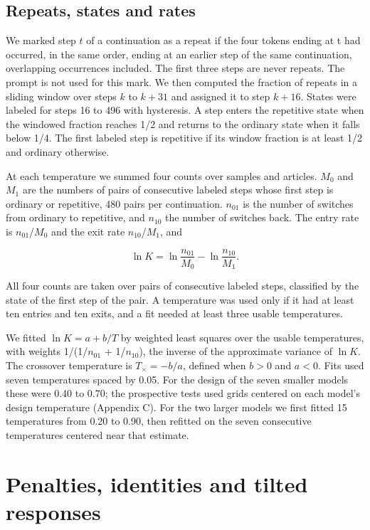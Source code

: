 \documentclass[aps,prx,onecolumn,superscriptaddress,longbibliography]{revtex4-2}
\begin{document}
\subsection{Repeats, states and rates}

We marked step \(t\) of a continuation as a repeat if the four tokens ending at t had occurred, in the same order, ending at an earlier step of the same continuation, overlapping occurrences included. The first three steps are never repeats. The prompt is not used for this mark. We then computed the fraction of repeats in a sliding window over steps \(k\) to \(k+31\) and assigned it to step \(k+16\). States were labeled for steps 16 to 496 with hysteresis. A step enters the repetitive state when the windowed fraction reaches 1/2 and returns to the ordinary state when it falls below 1/4. The first labeled step is repetitive if its window fraction is at least 1/2 and ordinary otherwise.

At each temperature we summed four counts over samples and articles. \(M_{0}\) and \(M_{1}\) are the numbers of pairs of consecutive labeled steps whose first step is ordinary or repetitive, 480 pairs per continuation. \(n_{01}\) is the number of switches from ordinary to repetitive, and \(n_{10}\) the number of switches back. The entry rate is \(n_{01}\)/\(M_{0}\) and the exit rate \(n_{10}\)/\(M_{1}\), and

\begin{equation}\ln K=\ln\frac{n_{01}}{M_0}-\ln\frac{n_{10}}{M_1}.\end{equation}

All four counts are taken over pairs of consecutive labeled steps, classified by the state of the first step of the pair. A temperature was used only if it had at least ten entries and ten exits, and a fit needed at least three usable temperatures.

We fitted \(\ln K=a+b/T\) by weighted least squares over the usable temperatures, with weights 1/(1/\(n_{01}\) + 1/\(n_{10}\)), the inverse of the approximate variance of \(\ln K\). The crossover temperature is \(T_\times=-b/a\), defined when \(b>0\) and \(a<0\). Fits used seven temperatures spaced by 0.05. For the design of the seven smaller models these were 0.40 to 0.70; the prospective tests used grids centered on each model's design temperature (Appendix C). For the two larger models we first fitted 15 temperatures from 0.20 to 0.90, then refitted on the seven consecutive temperatures centered near that estimate.

\section{Penalties, identities and tilted responses}
\end{document}
